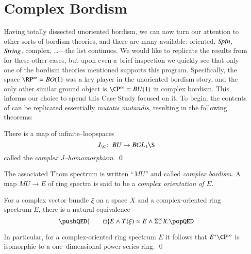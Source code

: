 
\chapter{Complex Bordism}\label{ComplexBordismChapter}


Having totally dissected unoriented bordism, we can now turn our attention to other sorts of bordism theories, and there are many available: oriented, $\mathit{Spin}$, $\mathit{String}$, complex, \ldots---the list continues.  We would like to replicate the results from  for these other cases, but upon even a brief inspection we quickly see that only one of the bordism theories mentioned supports this program.  Specifically, the space $\RP^\infty = BO(1)$ was a key player in the unoriented bordism story, and the only other similar ground object is $\CP^\infty = BU(1)$ in complex bordism.  This informs our choice to spend this Case Study focused on it.  To begin, the contents of  can be replicated essentially \textit{mutatis mutandis}, resulting in the following theorems:

\begin{theorem}\label{ComplexJHomomorphism}
There is a map of infinite--loopspaces \[J_{\C}\co BU \to B \GL_1 \S\] called the \textit{complex $J$--homomorphism}. \qed
\end{theorem}

\begin{definition}\label{DefnComplexOrientation}
The associated Thom spectrum is written ``$MU$'' and called \textit{complex bordism}.  A map $MU \to E$ of ring spectra is said to be a \textit{complex orientation of $E$}.
\end{definition}

\begin{theorem}\label{ThomIsomOverC}
For a complex vector bundle $\xi$ on a space $X$ and a complex-oriented ring spectrum $E$, there is a natural equivalence \[\pushQED{\qed}
E \sm T(\xi) \simeq E \sm \Susp^\infty_+ X. \qedhere
\popQED\]
\end{theorem}

\begin{corollary}\label{CPinftyNiceCalculation}
In particular, for a complex-oriented ring spectrum $E$ it follows that $E^* \CP^\infty$ is isomorphic to a one--dimensional power series ring. \qed
\end{corollary}

